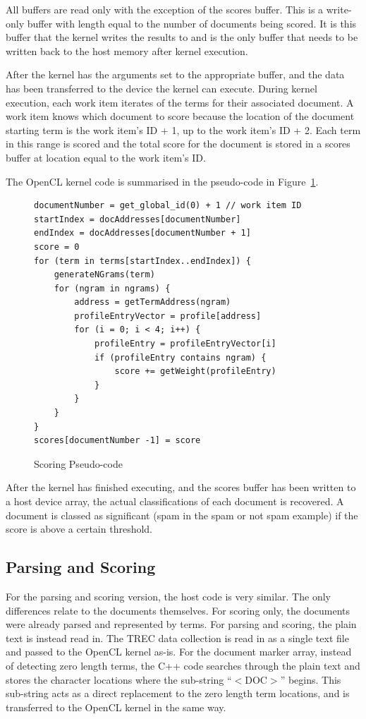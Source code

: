 All buffers are read only with the exception of the scores buffer. This is a
write-only buffer with length equal to the number of documents being scored. It
is this buffer that the kernel writes the results to and is the only buffer that
needs to be written back to the host memory after kernel execution.

After the kernel has the arguments set to the appropriate buffer, and the data
has been transferred to the device the kernel can execute. During kernel
execution, each work item iterates of the terms for their associated document. A
work item knows which document to score because the location of the document
starting term is the work item's ID + 1, up to the work item's ID + 2. Each term
in this range is scored and the total score for the document is stored in a
scores buffer at location equal to the work item's ID.

The OpenCL kernel code is summarised in the pseudo-code in
Figure~\ref{fig:scoringPseudocode}.

\begin{figure}
\begin{verbatim}
documentNumber = get_global_id(0) + 1 // work item ID
startIndex = docAddresses[documentNumber]
endIndex = docAddresses[documentNumber + 1]
score = 0
for (term in terms[startIndex..endIndex]) {
    generateNGrams(term)
    for (ngram in ngrams) {
        address = getTermAddress(ngram)
        profileEntryVector = profile[address]
        for (i = 0; i < 4; i++) {
            profileEntry = profileEntryVector[i]
            if (profileEntry contains ngram) {
                score += getWeight(profileEntry)
            }
        }
    }
}
scores[documentNumber -1] = score
\end{verbatim}
\caption{Scoring Pseudo-code}
\label{fig:scoringPseudocode}
\end{figure}

After the kernel has finished executing, and the scores buffer has been written
to a host device array, the actual classifications of each document is
recovered. A document is classed as significant (spam in the spam or not spam
example) if the score is above a certain threshold.

\subsection{Parsing and Scoring}

For the parsing and scoring version, the host code is very similar. The only
differences relate to the documents themselves. For scoring only, the documents
were already parsed and represented by terms. For parsing and scoring, the plain
text is instead read in. The TREC data collection is read in as a single text
file and passed to the OpenCL kernel as-is. For the document marker array,
instead of detecting zero length terms, the C++ code searches through the plain
text and stores the character locations where the sub-string ``$<$DOC$>$''
begins. This sub-string acts as a direct replacement to the zero length term
locations, and is transferred to the OpenCL kernel in the same way.

